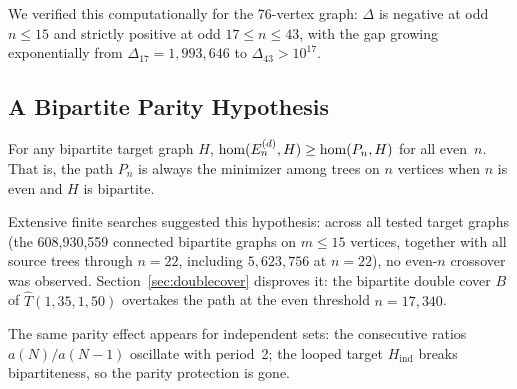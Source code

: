 \noindent
We verified this computationally for the 76-vertex graph: $\Delta$
is negative at odd $n \le 15$ and strictly positive at odd
$17\le n\le43$, with the gap growing
exponentially from $\Delta_{17} = 1{,}993{,}646$ to
$\Delta_{43} > 10^{17}$.

\subsection*{A Bipartite Parity Hypothesis}

\begin{remark}
For any bipartite target graph $H$, $\mathrm{hom}(E_n^{(d)}, H) \ge
\mathrm{hom}(P_n, H)$ for all even~$n$.  That is, the path $P_n$ is
always the minimizer among trees on $n$ vertices when $n$ is even
and $H$ is bipartite.
\end{remark}

\noindent
Extensive finite searches suggested this hypothesis: across all tested
target graphs (the 608,930,559 connected bipartite graphs on $m \le 15$
vertices, together with all source trees through $n=22$, including
$5{,}623{,}756$ at $n=22$), no even-$n$ crossover was observed.
Section~\ref{sec:doublecover}
disproves it: the bipartite double cover $B$ of $\hat T(1,35,1,50)$
overtakes the path at the even threshold $n = 17{,}340$.

\begin{remark}
The same parity effect appears for independent sets: the consecutive
ratios $a(N)/a(N-1)$ oscillate with period~2; the looped target
$H_{\mathrm{ind}}$ breaks bipartiteness, so the parity protection is
gone.
\end{remark}
